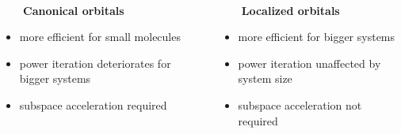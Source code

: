 \begin{frame}
\ \\
\begin{columns}
\begin{column}{0.5\textwidth}
\ \ \ \ \textbf{Canonical orbitals}
\begin{itemize}
    \item more efficient for small molecules
    \item power iteration deteriorates for bigger systems
    \item subspace acceleration required
\end{itemize}
\end{column}
\begin{column}{0.5\textwidth}
\ \ \ \ \textbf{Localized orbitals}
\begin{itemize}
    \item more efficient for bigger systems
    \item power iteration unaffected by system size
    \item subspace acceleration not required
\end{itemize}
\end{column}
\end{columns}
\end{frame}

